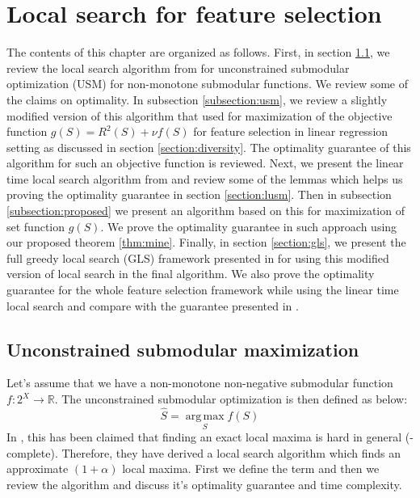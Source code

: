 \chapter{Local search for feature selection}
\label{chapter:work}
The contents of this chapter are organized as follows. First, in section \ref{section:usm}, we review the local search algorithm from \citealp{Feige:2011:MNS:2079073.2079078} for unconstrained submodular optimization (USM) for non-monotone submodular functions. We review some of the claims on optimality. In subsection \ref{subsection:usm}, we review a slightly modified version of this algorithm that \citealp{NIPS2012_4689} used for maximization of the objective function $g(S)=R^2(S)+\nu f(S)$ for feature selection in linear regression setting as discussed in section \ref{section:diversity}. The optimality guarantee of this algorithm for such an objective function is reviewed. Next, we present the linear time local search algorithm from \citealp{Buchbinder:2012:TLT:2417500.2417835} and review some of the lemmas which helps us proving the optimality guarantee in section \ref{section:lusm}. Then in subsection \ref{subsection:proposed} we present an algorithm based on this for maximization of set function $g(S)$. We prove the optimality guarantee in such approach using our proposed theorem \ref{thm:mine}. Finally, in section \ref{section:gls}, we present the full greedy local search (GLS) framework presented in \citealp{NIPS2012_4689} for using this modified version of local search in the final algorithm. We also prove the optimality guarantee for the whole feature selection framework while using the linear time local search and compare with the guarantee presented in \citealp{NIPS2012_4689}.

\section{Unconstrained submodular maximization}
\label{section:usm}
Let's assume that we have a non-monotone non-negative submodular function $f:2^X\rightarrow \mathbb{R}$. The unconstrained submodular optimization is then defined as below:
\[\hat{S}=\operatorname*{arg\,max}_{S} f(S)\]
\noindent In \citealp{Feige:2011:MNS:2079073.2079078}, this has been claimed that finding an exact local maxima is hard in general (\PLS-complete). Therefore, they have derived a local search algorithm which finds an approximate $(1+\alpha)$ local maxima. First we define the term and then we review the algorithm and discuss it's optimality guarantee and time complexity.

